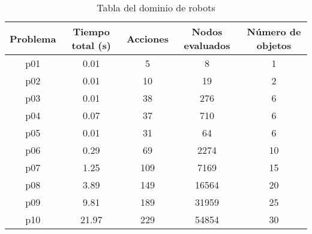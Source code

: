 \documentclass{article}
\begin{document}
\begin{table}[h]
    \centering
    \begin{tabular}{|c|c|c|c|c|}
    \hline
    \textbf{Problema} & \textbf{Tiempo total (s)} & \textbf{Acciones} & \textbf{Nodos evaluados} & \textbf{Número de objetos} \\ \hline
    p01               & 0.01                       & 5                  & 8                         & 1                           \\ \hline
    p02               & 0.01                       & 10                 & 19                        & 2                           \\ \hline
    p03               & 0.01                       & 38                 & 276                       & 6                           \\ \hline
    p04               & 0.07                       & 37                 & 710                       & 6                           \\ \hline
    p05               & 0.01                       & 31                 & 64                        & 6                           \\ \hline
    p06               & 0.29                       & 69                 & 2274                      & 10                          \\ \hline
    p07               & 1.25                       & 109                & 7169                      & 15                          \\ \hline
    p08               & 3.89                       & 149                & 16564                     & 20                          \\ \hline
    p09               & 9.81                       & 189                & 31959                     & 25                          \\ \hline
    p10               & 21.97                      & 229                & 54854                     & 30                          \\ \hline
    \end{tabular}
    \caption{Tabla del dominio de robots}
    \label{tabla:dominio_robots}
\end{table}
\end{document}
